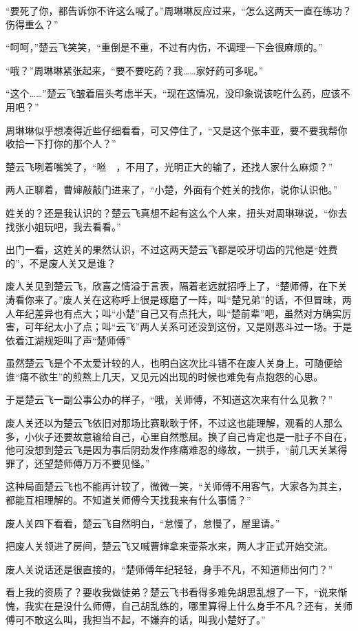 “要死了你，都告诉你不许这么喊了。”周琳琳反应过来，“怎么这两天一直在练功？伤得重么？”

“呵呵，”楚云飞笑笑，“重倒是不重，不过有内伤，不调理一下会很麻烦的。”

“哦？”周琳琳紧张起来，“要不要吃药？我……家好药可多呢。”

“这个……”楚云飞皱着眉头考虑半天，“现在这情况，没印象说该吃什么药，应该不用吧？”

周琳琳似乎想凑得近些仔细看看，可又停住了，“又是这个张丰亚，要不要我帮你收拾一下打你的那个人？”

楚云飞咧着嘴笑了，“咝~~，不用了，光明正大的输了，还找人家什么麻烦？”

两人正聊着，曹婶敲敲门进来了，“小楚，外面有个姓关的找你，说你认识他。”

姓关的？还是我认识的？楚云飞真想不起有这么个人来，扭头对周琳琳说，“你去找张小姐玩吧，我去看看。”

出门一看，这姓关的果然认识，不过这两天楚云飞都是咬牙切齿的咒他是“姓费的”，不是废人关又是谁？

废人关见到楚云飞，欣喜之情溢于言表，隔着老远就招呼上了，“楚师傅，在下关涛看你来了。”废人关在这称呼上很是琢磨了一阵，叫“楚兄弟”的话，不但冒昧，两人年纪差异也有点大；叫“小楚”自己又有点托大，叫“楚前辈”吧，虽然对方确实厉害，可年纪太小了点；叫“云飞”两人关系可还没到这份，又是刚恶斗过一场。于是依着江湖规矩叫了声“楚师傅”

虽然楚云飞是个不太爱计较的人，也明白这次比斗错不在废人关身上，可随便给谁“痛不欲生”的煎熬上几天，又见元凶出现的时候也难免有点抱怨的心思。

于是楚云飞一副公事公办的样子，“哦，关师傅，不知道这次来有什么见教？”

废人关还以为楚云飞依旧对那场比赛耿耿于怀，不过这也能理解，观看的人那么多，小伙子还要故意输给自己，心里自然憋屈。换了自己肯定也是一肚子不自在，他可没想到楚云飞是因为事后阴劲发作疼痛难忍的缘故，一拱手，“前几天关某得罪了，还望楚师傅万万不要见怪。”

这种局面楚云飞也不能再计较了，微微一笑，“关师傅不用客气，大家各为其主，都能互相理解的。不知道关师傅今天找我来有什么事情？”

废人关四下看看，楚云飞自然明白，“怠慢了，怠慢了，屋里请。”

把废人关领进了房间，楚云飞又喊曹婶拿来壶茶水来，两人才正式开始交流。

废人关说话还是很直接的，“楚师傅年纪轻轻，身手不凡，不知道师出何门？”

看上我的资质了？要收我做徒弟？楚云飞书看得多难免胡思乱想了一下，“说来惭愧，我实在是没什么师傅，自己胡乱练的，哪里算得上什么身手不凡？还有，关师傅可不敢这么叫，我担当不起，不嫌弃的话，叫我小楚好了。”

